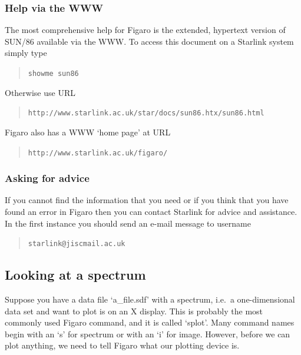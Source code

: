 \documentclass[11pt,twoside]{article}
\newcommand{\htmladdnormallink}[2]{#1}
\newcommand{\xlabel}[1]{}
\begin{document}
\subsubsection{\label{gethelpfigwww}Help via the WWW}

   The most comprehensive help for Figaro is the extended, hypertext
   version of SUN/86 available via the WWW.  To access this document
   on a Starlink system simply type

  \begin{quote}
   {\tt showme sun86}
  \end{quote}

   Otherwise use URL

  \begin{quote}
   {\tt http://www.starlink.ac.uk/star/docs/sun86.htx/sun86.html}
  \end{quote}

   Figaro also has a WWW `home page' at URL

  \begin{quote}
  \htmladdnormallink{ {\tt http://www.starlink.ac.uk/figaro/}}
   {http://www.starlink.ac.uk/figaro/}
  \end{quote}


\subsubsection{\label{gethelpsupport}Asking for advice}

   If you cannot find the information that you need or if you think
   that you have found an error in Figaro then you can contact Starlink
   for advice and assistance.  In the first instance you should send an
   e-mail message to username

  \begin{quote}
   {\tt starlink@jiscmail.ac.uk}
  \end{quote}


\subsection{\xlabel{lookspec}\label{lookspec}Looking at a spectrum}

   Suppose you have a data file `a\_file.sdf' with a spectrum, i.e.\ a
   one-dimensional data set and want to plot is on an X display. This is
   probably the most commonly used Figaro command, and it is called
   `splot'. Many command names begin with an `s' for spectrum or with
   an `i' for image. However, before we can plot anything, we need to
   tell Figaro what our plotting device is.
\end{document}
